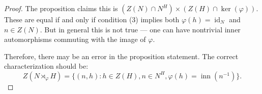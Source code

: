 \begin{proof}
    The proposition claims this is $(Z(N) \cap N^H) \times (Z(H) \cap \ker(\varphi))$. These are equal if and only if condition (3) implies both $\varphi(h) = \operatorname{id}_N$ and $n \in Z(N)$. But in general this is not true — one can have nontrivial inner automorphisms commuting with the image of $\varphi$.

    Therefore, there may be an error in the proposition statement. The correct characterization should be:
    $$Z(N \rtimes_\varphi H) = \{ (n,h) : h \in Z(H), n \in N^H, \varphi(h) = \operatorname{inn}(n^{-1}) \}.$$
\end{proof}
